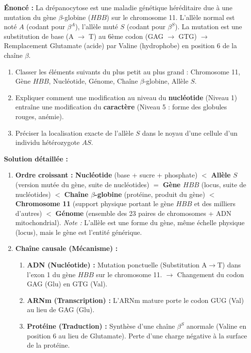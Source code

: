 \documentclass[11pt]{article}
\begin{document}
\begin{exoresolu}
\textbf{Énoncé :} La drépanocytose est une maladie génétique héréditaire due à une mutation du gène $\beta$-globine ($HBB$) sur le chromosome 11. L'allèle normal est noté $A$ (codant pour $\beta^A$), l'allèle muté $S$ (codant pour $\beta^S$). La mutation est une substitution de base (A $\rightarrow$ T) au 6ème codon (GAG $\rightarrow$ GTG) $\rightarrow$ Remplacement Glutamate (acide) par Valine (hydrophobe) en position 6 de la chaîne $\beta$.
\begin{enumerate}
    \item Classer les éléments suivants du plus petit au plus grand : Chromosome 11, Gène $HBB$, Nucléotide, Génome, Chaîne $\beta$-globine, Allèle $S$.
    \item Expliquer comment une modification au niveau du \textbf{nucléotide} (Niveau 1) entraîne une modification du \textbf{caractère} (Niveau 5 : forme des globules rouges, anémie).
    \item Préciser la localisation exacte de l'allèle $S$ dans le noyau d'une cellule d'un individu hétérozygote $AS$.
\end{enumerate}
\tcblower
\textbf{Solution détaillée :}
\begin{enumerate}
    \item \textbf{Ordre croissant :}
        \textbf{Nucléotide} (base + sucre + phosphate) $<$ \textbf{Allèle $S$} (version mutée du gène, suite de nucléotides) $=$ \textbf{Gène $HBB$} (locus, suite de nucléotides) $<$ \textbf{Chaîne $\beta$-globine} (protéine, produit du gène) $<$ \textbf{Chromosome 11} (support physique portant le gène $HBB$ et des milliers d'autres) $<$ \textbf{Génome} (ensemble des 23 paires de chromosomes + ADN mitochondrial).
        \textit{Note :} L'allèle est une forme du gène, même échelle physique (locus), mais le gène est l'entité générique.
    \item \textbf{Chaîne causale (Mécanisme) :}
        \begin{enumerate}
            \item \textbf{ADN (Nucléotide) :} Mutation ponctuelle (Substitution A$\rightarrow$T) dans l'exon 1 du gène $HBB$ sur le chromosome 11. $\rightarrow$ Changement du codon GAG (Glu) en GTG (Val).
            \item \textbf{ARNm (Transcription) :} L'ARNm mature porte le codon GUG (Val) au lieu de GAG (Glu).
            \item \textbf{Protéine (Traduction) :} Synthèse d'une chaîne $\beta^S$ anormale (Valine en position 6 au lieu de Glutamate). Perte d'une charge négative à la surface de la protéine.

\end{enumerate}
\end{enumerate}
\end{exoresolu}
\end{document}
